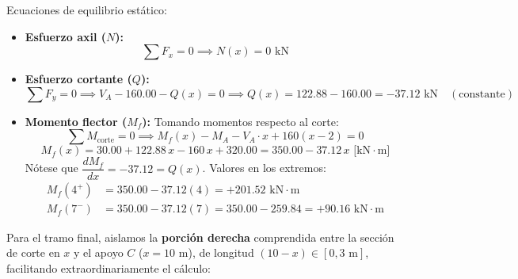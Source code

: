 Ecuaciones de equilibrio estático:
\begin{itemize}
    \item \textbf{Esfuerzo axil ($N$):}
          \begin{equation}
              \sum F_x = 0 \implies \boxed{N(x) = 0\text{ kN}}
          \end{equation}

    \item \textbf{Esfuerzo cortante ($Q$):}
          \begin{equation}
              \sum F_y = 0 \implies V_A - 160.00 - Q(x) = 0 \implies \boxed{Q(x) = 122.88 - 160.00 = -37.12\text{ kN}} \quad (\text{constante})
          \end{equation}

    \item \textbf{Momento flector ($M_f$):}
          Tomando momentos respecto al corte:
          \begin{equation}
              \sum M_{\text{corte}} = 0 \implies M_f(x) - M_A - V_A \cdot x + 160(x - 2) = 0
          \end{equation}
          \begin{equation}
              \boxed{M_f(x) = 30.00 + 122.88\,x - 160\,x + 320.00 = 350.00 - 37.12\,x\text{ [kN}\cdot\text{m]}}
          \end{equation}
          Nótese que $\dfrac{dM_f}{dx} = -37.12 = Q(x)$.
          Valores en los extremos:
          \begin{align*}
              M_f(4^+) & = 350.00 - 37.12(4) = \boxed{+201.52\text{ kN}\cdot\text{m}}                  \\
              M_f(7^-) & = 350.00 - 37.12(7) = 350.00 - 259.84 = \boxed{+90.16\text{ kN}\cdot\text{m}}
          \end{align*}
\end{itemize}


Para el tramo final, aislamos la \textbf{porción derecha} comprendida entre la sección de corte en $x$ y el apoyo $C$ ($x = 10\text{ m}$), de longitud $(10 - x) \in [0, 3\text{ m}]$, facilitando extraordinariamente el cálculo:

